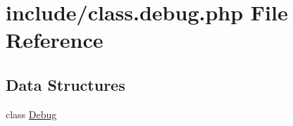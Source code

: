 \hypertarget{class_8debug_8php}{\section{include/class.debug.\-php File Reference}
\label{class_8debug_8php}
}
\subsection*{Data Structures}
\begin{DoxyCompactItemize}
\item 
class \hyperlink{class_debug}{Debug}
\end{DoxyCompactItemize}
